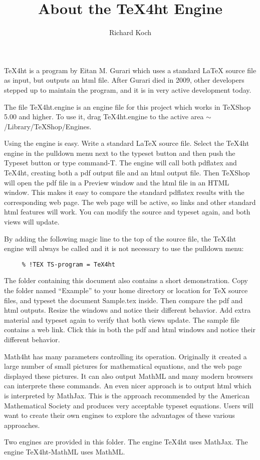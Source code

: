 \documentclass[11pt, oneside]{article}   	%
\title{About the TeX4ht Engine}
\author{Richard Koch}
\begin{document}
\maketitle
TeX4ht is a program by Eitan M. Gurari which uses a standard LaTeX source file as input, but outputs an html file. After Gurari died in 2009, other developers stepped up to maintain the program, and it is in very active development today. 

The file TeX4ht.engine is an engine file for this project which works in TeXShop 5.00 and higher. To use it, drag TeX4ht.engine to the active  area $\sim$/Library/TeXShop/Engines. 

Using the engine is easy. Write a standard LaTeX source file. Select the TeX4ht engine in the pulldown menu next to the typeset button and then push the Typeset button or type command-T. The engine will call both pdflatex and TeX4ht, creating both a pdf output file and an html output file. Then TeXShop will open the pdf file in a Preview window and the html file in an HTML window. This makes it easy to compare the standard pdflatex results with the corresponding web page. The web page will be active, so links and other standard html features will work. You can modify the source and typeset again, and both views will update.

By adding the following magic line to the top of the source file, the TeX4ht engine will always be called and it is not necessary to use the pulldown menu:
\begin{verbatim}
     % !TEX TS-program = TeX4ht
\end{verbatim}

The folder containing this document also contains a short demonstration. Copy the folder named ``Example'' to your home directory or location for TeX source files, and typeset the document Sample.tex inside. Then compare the pdf and html outputs. Resize the windows and notice their different behavior. Add extra material and typeset again to verify that both views update. The sample file contains a web link. Click this in both the pdf and html windows and notice their different behavior.

Math4ht has many parameters controlling its operation. Originally it created a large number of small pictures for  mathematical equations, and the web page displayed these pictures. It can also output MathML and many modern browsers can interprete these commands. An even nicer approach is to output html which is interpreted by MathJax. This  is the approach recommended by the American Mathematical Society and produces very acceptable typeset equations. Users will want to create their own engines to explore the advantages of these various approaches.

Two engines are provided in this folder. The engine TeX4ht uses MathJax. The engine TeX4ht-MathML uses MathML. 
\end{document}
